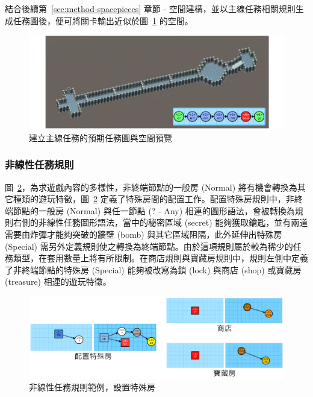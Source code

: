 結合後續第~\ref{sec:method-spacepieces} 章節 - 空間建構，並以主線任務相關規則生成任務圖後，便可將關卡輸出近似於圖~\ref{fig:missiongrammars-rules-linear-preview} 的空間。

\begin{figure}[ht]
  \begin{center}
    \includegraphics[width=1.0\textwidth]{figures/missiongrammars-rules-linear-preview.png}
    \caption{建立主線任務的預期任務圖與空間預覽}
    \label{fig:missiongrammars-rules-linear-preview}
  \end{center}
\end{figure}

\subsubsection{非線性任務規則}
\label{sssec:method-missiongrammars-rules-nonlinearrules}

圖~\ref{fig:missiongrammars-rules-nonlinear-example1}，為求遊戲內容的多樣性，非終端節點的一般房 (Normal) 將有機會轉換為其它種類的遊玩特徵，圖~\ref{fig:missiongrammars-rules-nonlinear-example1} 定義了特殊房間的配置工作。配置特殊房規則中，非終端節點的一般房 (Normal) 與任一節點 (? - Any) 相連的圖形語法，會被轉換為規則右側的非線性任務圖形語法，當中的秘密區域 (secret) 能夠獲取鑰匙，並有兩道需要由炸彈才能夠突破的牆壁 (bomb) 與其它區域阻隔，此外延伸出特殊房 (Special) 需另外定義規則使之轉換為終端節點。由於這項規則屬於較為稀少的任務類型，在套用數量上將有所限制。在商店規則與寶藏房規則中，規則左側中定義了非終端節點的特殊房 (Special) 能夠被改寫為鎖 (lock) 與商店 (shop) 或寶藏房 (treasure) 相連的遊玩特徵。

\begin{figure}[ht]
  \begin{center}
    \includegraphics[width=1.0\textwidth]{figures/missiongrammars-rules-nonlinear-example1.png}
    \caption{非線性任務規則範例，設置特殊房}
    \label{fig:missiongrammars-rules-nonlinear-example1}
  \end{center}
\end{figure}


